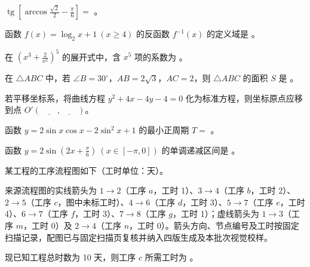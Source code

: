 \begin{question}
$\operatorname{tg}\left[\arccos\frac{\sqrt2}{2}-\frac\pi6\right]=$ \gkblank{}。

\end{question}
\begin{question}
函数 $f(x)=\log_2 x+1\ (x\ge4)$ 的反函数 $f^{-1}(x)$ 的定义域是 \gkblank{}。

\end{question}
\begin{question}
在 $\left(x^3+\frac{2}{x^2}\right)^5$ 的展开式中，含 $x^5$ 项的系数为 \gkblank{}。

\end{question}
\begin{question}
在 $\triangle ABC$ 中，若 $\angle B=30^\circ$，$AB=2\sqrt3$，$AC=2$，则 $\triangle ABC$ 的面积 $S$ 是 \gkblank{}。

\end{question}
\begin{question}
若平移坐标系，将曲线方程 $y^2+4x-4y-4=0$ 化为标准方程，则坐标原点应移到点 $O'(\underline{\qquad},\underline{\qquad})$。

\end{question}
\begin{question}
函数 $y=2\sin x\cos x-2\sin^2x+1$ 的最小正周期 $T=$ \gkblank{}。

\end{question}
\begin{question}
函数 $y=2\sin\left(2x+\frac\pi6\right)\ (x\in[-\pi,0])$ 的单调递减区间是 \gkblank{}。

\Needspace{0.4\textheight}
\end{question}
\begin{question}
某工程的工序流程图如下（工时单位：天）。
\nopagebreak[4]
\begin{center}\end{center}
\nopagebreak[4]
来源流程图的实线箭头为 $1\to2$（工序 $a$，工时 1）、$3\to4$（工序 $b$，工时 2）、$2\to5$（工序 $c$，图中未标工时）、$4\to6$（工序 $d$，工时 3）、$5\to7$（工序 $e$，工时 4）、$6\to7$（工序 $f$，工时 3）、$7\to8$（工序 $g$，工时 1）；虚线箭头为 $1\to3$（工序 $m$，工时 0）及 $2\to4$（工序 $n$，工时 0）。箭头方向、节点编号及工时按固定扫描记录，配图已与固定扫描页复核并纳入四版生成及本批次视觉校样。

现已知工程总时数为 10 天，则工序 $c$ 所需工时为 \gkblank{}。

\end{question}
